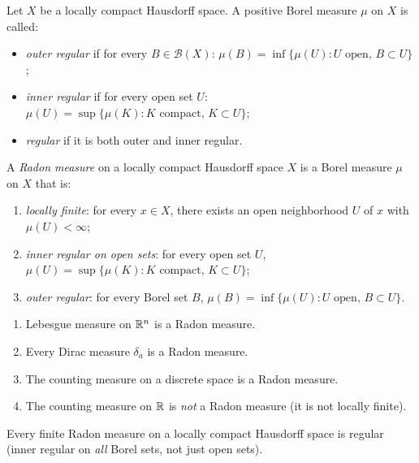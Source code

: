 \begin{definition}
\label{def:regular}
Let $X$ be a locally compact Hausdorff space. A positive Borel measure $\mu$ on $X$
is called:
\begin{itemize}
    \item \emph{outer regular} if for every
    $B \in \mathcal{B}(X)$:
    $\mu(B) = \inf\{\mu(U) : U \text{ open},\, B \subset U\}$;
    \item \emph{inner regular} if for every open set $U$:
    $\mu(U) = \sup\{\mu(K) : K \text{ compact},\, K \subset U\}$;
    \item \emph{regular} if it is both outer and inner regular.
\end{itemize}
\end{definition}

\begin{definition}
\label{def:radon}
A \emph{Radon measure} on a locally compact Hausdorff space $X$ is a Borel measure
$\mu$ on $X$ that is:
\begin{enumerate}
    \item[(i)] \emph{locally finite}: for every $x \in X$, there exists an open
    neighborhood $U$ of $x$ with $\mu(U) < \infty$;
    \item[(ii)] \emph{inner regular on open sets}: for every open set $U$,
    $\mu(U) = \sup\{\mu(K) : K \text{ compact},\, K \subset U\}$;
    \item[(iii)] \emph{outer regular}: for every Borel set $B$,
    $\mu(B) = \inf\{\mu(U) : U \text{ open},\, B \subset U\}$.
\end{enumerate}
\end{definition}

\begin{example}
\begin{enumerate}
    \item Lebesgue measure on $\mathbb{R}^n$ is a Radon measure.
    \item Every Dirac measure $\delta_a$ is a Radon measure.
    \item The counting measure on a discrete space is a Radon measure.
    \item The counting measure on $\mathbb{R}$ is \emph{not} a Radon measure (it is not
    locally finite).
\end{enumerate}
\end{example}

\begin{proposition}
Every finite Radon measure on a locally compact Hausdorff space is regular (inner
regular on \emph{all} Borel sets, not just open sets).
\end{proposition}

